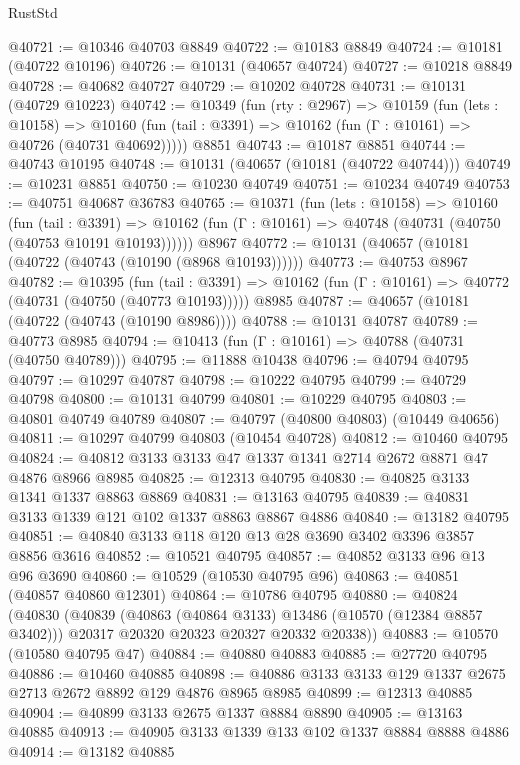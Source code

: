 \begin{lexlean}{RustStd}
\begin{coremodule}
@40721 := @10346 @40703 @8849
@40722 := @10183 @8849
@40724 := @10181 (@40722 @10196)
@40726 := @10131 (@40657 @40724)
@40727 := @10218 @8849
@40728 := @40682 @40727
@40729 := @10202 @40728
@40731 := @10131 (@40729 @10223)
@40742 := @10349
    (fun (rty : @2967) =>
    @10159
      (fun (lets : @10158) =>
      @10160 (fun (tail : @3391) => @10162 (fun (Γ : @10161) => @40726 (@40731 @40692)))))
    @8851
@40743 := @10187 @8851
@40744 := @40743 @10195
@40748 := @10131 (@40657 (@10181 (@40722 @40744)))
@40749 := @10231 @8851
@40750 := @10230 @40749
@40751 := @10234 @40749
@40753 := @40751 @40687 @36783
@40765 := @10371
    (fun (lets : @10158) =>
    @10160
      (fun (tail : @3391) =>
      @10162 (fun (Γ : @10161) => @40748 (@40731 (@40750 (@40753 @10191 @10193))))))
    @8967
@40772 := @10131 (@40657 (@10181 (@40722 (@40743 (@10190 (@8968 @10193))))))
@40773 := @40753 @8967
@40782 := @10395
    (fun (tail : @3391) => @10162 (fun (Γ : @10161) => @40772 (@40731 (@40750 (@40773 @10193)))))
    @8985
@40787 := @40657 (@10181 (@40722 (@40743 (@10190 @8986))))
@40788 := @10131 @40787
@40789 := @40773 @8985
@40794 := @10413 (fun (Γ : @10161) => @40788 (@40731 (@40750 @40789)))
@40795 := @11888 @10438
@40796 := @40794 @40795
@40797 := @10297 @40787
@40798 := @10222 @40795
@40799 := @40729 @40798
@40800 := @10131 @40799
@40801 := @10229 @40795
@40803 := @40801 @40749 @40789
@40807 := @40797 (@40800 @40803) (@10449 @40656)
@40811 := @10297 @40799 @40803 (@10454 @40728)
@40812 := @10460 @40795
@40824 := @40812 @3133 @3133 @47 @1337 @1341 @2714 @2672 @8871 @47 @4876 @8966 @8985
@40825 := @12313 @40795
@40830 := @40825 @3133 @1341 @1337 @8863 @8869
@40831 := @13163 @40795
@40839 := @40831 @3133 @1339 @121 @102 @1337 @8863 @8867 @4886
@40840 := @13182 @40795
@40851 := @40840 @3133 @118 @120 @13 @28 @3690 @3402 @3396 @3857 @8856 @3616
@40852 := @10521 @40795
@40857 := @40852 @3133 @96 @13 @96 @3690
@40860 := @10529 (@10530 @40795 @96)
@40863 := @40851 (@40857 @40860 @12301)
@40864 := @10786 @40795
@40880 := @40824
    (@40830
      (@40839
        (@40863 (@40864 @3133) @13486 (@10570 (@12384 @8857 @3402)))
        @20317
        @20320
        @20323
        @20327
        @20332
        @20338))
@40883 := @10570 (@10580 @40795 @47)
@40884 := @40880 @40883
@40885 := @27720 @40795
@40886 := @10460 @40885
@40898 := @40886 @3133 @3133 @129 @1337 @2675 @2713 @2672 @8892 @129 @4876 @8965 @8985
@40899 := @12313 @40885
@40904 := @40899 @3133 @2675 @1337 @8884 @8890
@40905 := @13163 @40885
@40913 := @40905 @3133 @1339 @133 @102 @1337 @8884 @8888 @4886
@40914 := @13182 @40885

\end{coremodule}
\end{lexlean}
